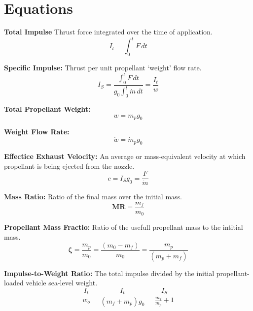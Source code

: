 \documentclass[12pt]{article}
\begin{document}
\section*{Equations}

\textbf{Total Impulse}
Thrust force integrated over the time of application.
\begin{equation}
    I_t = \int_{0}^{t}F\,dt 
\end{equation}

\bigskip
\noindent
\textbf{Specific Impulse:}
Thrust per unit propellant `weight' flow rate. 
\begin{equation}
    I_S = \frac{\int_{0}^{t}F\,dt }{g_0\int_{0}^{t}\dot{m}\,dt} = \frac{I_t}{w} 
\end{equation}

\bigskip
\noindent
\textbf{Total Propellant Weight:}
\begin{equation}
    w = m_p g_0
\end{equation}

\bigskip
\noindent
\textbf{Weight Flow Rate:}
\begin{equation}
    \dot{w} = \dot{m}_p g_0
\end{equation}

\bigskip
\noindent
\textbf{Effectice Exhaust Velocity: }
An average or mass-equivalent velocity at which propellant is being ejected from the nozzle.
\begin{equation}
    c = I_S g_0 = \frac{F}{\dot{m}}
\end{equation}

\bigskip
\noindent
\textbf{Mass Ratio:}
Ratio of the final mass over the initial mass. 
\begin{equation}
    \mathbf{M}\mathbf{R} = \frac{m_f}{m_0}
\end{equation}

\bigskip
\noindent
\textbf{Propellant Mass Fractio:}
Ratio of the usefull propellant mass to the intitial mass.
\begin{equation}
    \mathbf{\zeta} = \frac{m_p}{m_0} = \frac{(m_0 - m_f)}{m_0} = \frac{m_p}{(m_p + m_f)}
\end{equation}

\bigskip
\noindent
\textbf{Impulse-to-Weight Ratio:}
The total impulse divided by the initial propellant-loaded vehicle sea-level weight.
\begin{equation}
    \frac{I_t}{w_o} = \frac{I_t}{(m_f + m_p) g_0} = \frac{I_S}{\frac{m_f}{m_p} + 1}
\end{equation}
\end{document}
